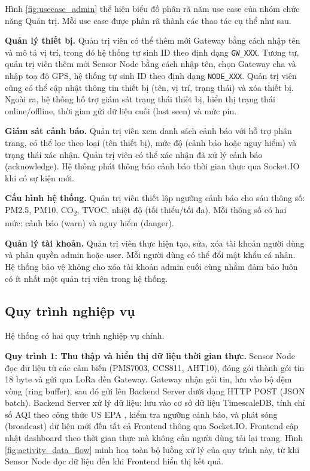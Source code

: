\documentclass[../DoAn.tex]{subfiles}
\begin{document}
Hình \ref{fig:usecase_admin} thể hiện biểu đồ phân rã năm use case của nhóm chức năng Quản trị. Mỗi use case được phân rã thành các thao tác cụ thể như sau.

\textbf{Quản lý thiết bị.} Quản trị viên có thể thêm mới Gateway bằng cách nhập tên và mô tả vị trí, trong đó hệ thống tự sinh ID theo định dạng \texttt{GW\_XXX}. Tương tự, quản trị viên thêm mới Sensor Node bằng cách nhập tên, chọn Gateway cha và nhập toạ độ GPS, hệ thống tự sinh ID theo định dạng \texttt{NODE\_XXX}. Quản trị viên cũng có thể cập nhật thông tin thiết bị (tên, vị trí, trạng thái) và xóa thiết bị. Ngoài ra, hệ thống hỗ trợ giám sát trạng thái thiết bị, hiển thị trạng thái online/offline, thời gian gửi dữ liệu cuối (last seen) và mức pin.

\textbf{Giám sát cảnh báo.} Quản trị viên xem danh sách cảnh báo với hỗ trợ phân trang, có thể lọc theo loại (tên thiết bị), mức độ (cảnh báo hoặc nguy hiểm) và trạng thái xác nhận. Quản trị viên có thể xác nhận đã xử lý cảnh báo (acknowledge). Hệ thống phát thông báo cảnh báo thời gian thực qua Socket.IO khi có sự kiện mới.

\textbf{Cấu hình hệ thống.} Quản trị viên thiết lập ngưỡng cảnh báo cho sáu thông số: PM2.5, PM10, CO\textsubscript{2}, TVOC, nhiệt độ (tối thiểu/tối đa). Mỗi thông số có hai mức: cảnh báo (warn) và nguy hiểm (danger).

\textbf{Quản lý tài khoản.} Quản trị viên thực hiện tạo, sửa, xóa tài khoản người dùng và phân quyền admin hoặc user. Mỗi người dùng có thể đổi mật khẩu cá nhân. Hệ thống bảo vệ không cho xóa tài khoản admin cuối cùng nhằm đảm bảo luôn có ít nhất một quản trị viên trong hệ thống.

\subsection{Quy trình nghiệp vụ}
\label{subsection:2.2.4}

Hệ thống có hai quy trình nghiệp vụ chính.

\textbf{Quy trình 1: Thu thập và hiển thị dữ liệu thời gian thực.} Sensor Node đọc dữ liệu từ các cảm biến (PMS7003, CCS811, AHT10), đóng gói thành gói tin 18 byte và gửi qua LoRa đến Gateway. Gateway nhận gói tin, lưu vào bộ đệm vòng (ring buffer), sau đó gửi lên Backend Server dưới dạng HTTP POST (JSON batch). Backend Server xử lý dữ liệu: lưu vào cơ sở dữ liệu TimescaleDB, tính chỉ số AQI theo công thức US EPA \cite{usepa2018}, kiểm tra ngưỡng cảnh báo, và phát sóng (broadcast) dữ liệu mới đến tất cả Frontend thông qua Socket.IO. Frontend cập nhật dashboard theo thời gian thực mà không cần người dùng tải lại trang. Hình \ref{fig:activity_data_flow} minh hoạ toàn bộ luồng xử lý của quy trình này, từ khi Sensor Node đọc dữ liệu đến khi Frontend hiển thị kết quả.
\end{document}
